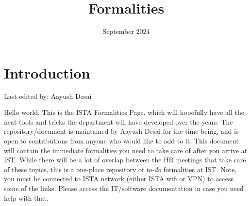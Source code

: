 \documentclass{article}
\title{Formalities}
\date{September 2024}
\newcommand{\setlasteditor}[1]{\gdef\lasteditor{#1}}
\newcommand{\lastedited}{%
    \vspace{1mm} {\footnotesize Last edited by: \lasteditor} \vspace{3mm}
    \newline

}
\begin{document}
\maketitle


\tableofcontents
\newpage
\section*{Introduction}
\setlasteditor{Aayush Desai}
\lastedited
\noindent
Hello world. This is the ISTA Formalities Page, which will hopefully have all the neat tools and tricks the department will have developed over the years. The repository/document is maintained by Aayush Desai for the time being, and is open to contributions from anyone who would like to add to it.
\newline
\noindent
This document will contain the immediate formalities you need to take care of after you arrive at IST. While there will be a lot of overlap between the HR meetings that take care of these topics, this is a one-place repository of \emph{to-do} formalities at IST. Note, you must be connected to ISTA network (either ISTA wifi or VPN) to access some of the links. Please access the IT/software documentation in case you need help with that. 

\end{document}
